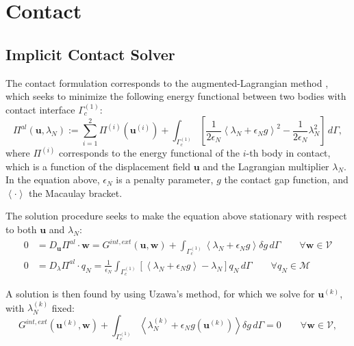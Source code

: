 

\chapter{Contact}

\section{Implicit Contact Solver}

The contact formulation corresponds to the augmented-Lagrangian method \cite{Laursen:2002}, which seeks to minimize the following energy functional between two bodies with contact interface $ \Gamma_c^{\left( 1 \right)} $:
\begin{equation} \label{eq:functinal}
  \Pi^{al} \left( \boldsymbol u, \lambda_N \right) := \sum_{i=1}^2 \Pi ^{\left( i \right) } ( \boldsymbol u ^{\left( i \right) }  ) + \int_{\Gamma_c^{\left( 1 \right) } } \left[ \frac{1}{2 \epsilon_N } \left< \lambda_N + \epsilon_N g \right>^ 2 - \frac{1}{2 \epsilon_N} \lambda^2_N \right] \, d\Gamma,
\end{equation}
where $ \Pi^{\left( i \right) } $ corresponds to the energy functional of the $ i $-th body in contact, which is a function of the displacement field $\boldsymbol u$ and the Lagrangian multiplier $\lambda_N$. In the equation above, $\epsilon_N$ is a penalty parameter,  $g$ the contact gap function, and $\left< \cdot \right>$ the Macaulay bracket.

The solution procedure seeks to make the equation above stationary with respect to both $\boldsymbol u$ and $\lambda_N$:
\begin{equation}
\begin{aligned}
 0 &= D_{\boldsymbol u} \Pi^{al} \cdot \boldsymbol w = G^{int,ext} \left( \boldsymbol u, \boldsymbol w \right) + \int_{\Gamma_c^{\left( 1 \right) } } \left< \lambda_N + \epsilon_N g \right> \delta g  \, d\Gamma  \qquad  \forall \boldsymbol w \in \mathcal{V} \\
0 &= D_{ \lambda} \Pi^{al} \cdot q_N  = \frac{1}{\epsilon_N} \int_{\Gamma_c^{\left( 1 \right) } } \left[ \left< \lambda_N + \epsilon_N g \right> - \lambda_N \right] q_N  \, d\Gamma  \qquad  \forall q_N \in \mathcal{M}
\end{aligned}
\end{equation}

A solution is then found by using Uzawa's method, for which we solve for $ \boldsymbol u ^ {\left( k \right) }$, with $ \lambda_N^{\left( k \right)}$ fixed:
\begin{equation}
 G^{int,ext} ( \boldsymbol u ^ {\left( k \right) }, \boldsymbol w ) + \int_{\Gamma_c^{\left( 1 \right) } } \left< \lambda_N^ {\left( k \right) } + \epsilon_N g( \boldsymbol u ^ {\left( k \right) } )  \right> \delta g  \, d\Gamma = 0 \qquad \forall \boldsymbol w \in \mathcal{V},
 \end{equation}

